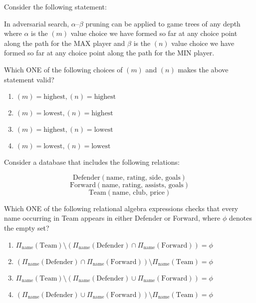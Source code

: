     \item Consider the following statement:

    In adversarial search, $\alpha$–$\beta$ pruning can be applied to game trees of any depth where $\alpha$ is the $(m)$ value choice we have formed so far at any choice point along the path for the MAX player and $\beta$ is the $(n)$ value choice we have formed so far at any choice point along the path for the MIN player.

    Which ONE of the following choices of $(m)$ and $(n)$ makes the above statement valid?

    \begin{enumerate}
        \item $(m) = \text{highest}, (n) = \text{highest}$
        \item $(m) = \text{lowest}, (n) = \text{highest}$
        \item $(m) = \text{highest}, (n) = \text{lowest}$
        \item $(m) = \text{lowest}, (n) = \text{lowest}$
    \end{enumerate}

    \item Consider a database that includes the following relations:

    \[
    \text{Defender}(\text{name, rating, side, goals})
    \]
    \[
    \text{Forward}(\text{name, rating, assists, goals})
    \]
    \[
    \text{Team}(\text{name, club, price})
    \]

    Which ONE of the following relational algebra expressions checks that every name occurring in Team appears in either Defender or Forward, where $\phi$ denotes the empty set?

    \begin{enumerate}
        \item $\Pi_{\text{name}}(\text{Team}) \setminus (\Pi_{\text{name}}(\text{Defender}) \cap \Pi_{\text{name}}(\text{Forward})) = \phi$
        \item $(\Pi_{\text{name}}(\text{Defender}) \cap \Pi_{\text{name}}(\text{Forward})) \setminus \Pi_{\text{name}}(\text{Team}) = \phi$
        \item $\Pi_{\text{name}}(\text{Team}) \setminus (\Pi_{\text{name}}(\text{Defender}) \cup \Pi_{\text{name}}(\text{Forward})) = \phi$
        \item $(\Pi_{\text{name}}(\text{Defender}) \cup \Pi_{\text{name}}(\text{Forward})) \setminus \Pi_{\text{name}}(\text{Team}) = \phi$
    \end{enumerate}

